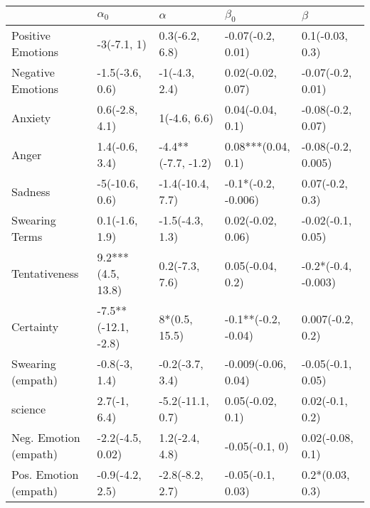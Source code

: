 \begin{tabular}{lllll}
\toprule
{} &           $\alpha_0$ &            $\alpha$ &            $\beta_0$ &              $\beta$ \\
\midrule
Positive Emotions     &          -3(-7.1, 1) &      0.3(-6.2, 6.8) &    -0.07(-0.2, 0.01) &      0.1(-0.03, 0.3) \\
Negative Emotions     &      -1.5(-3.6, 0.6) &       -1(-4.3, 2.4) &    0.02(-0.02, 0.07) &    -0.07(-0.2, 0.01) \\
Anxiety               &       0.6(-2.8, 4.1) &        1(-4.6, 6.6) &     0.04(-0.04, 0.1) &    -0.08(-0.2, 0.07) \\
Anger                 &       1.4(-0.6, 3.4) &  -4.4**(-7.7, -1.2) &   0.08***(0.04, 0.1) &   -0.08(-0.2, 0.005) \\
Sadness               &       -5(-10.6, 0.6) &    -1.4(-10.4, 7.7) &  -0.1*(-0.2, -0.006) &      0.07(-0.2, 0.3) \\
Swearing Terms        &       0.1(-1.6, 1.9) &     -1.5(-4.3, 1.3) &    0.02(-0.02, 0.06) &    -0.02(-0.1, 0.05) \\
Tentativeness         &    9.2***(4.5, 13.8) &      0.2(-7.3, 7.6) &     0.05(-0.04, 0.2) &  -0.2*(-0.4, -0.003) \\
Certainty             &  -7.5**(-12.1, -2.8) &       8*(0.5, 15.5) &  -0.1**(-0.2, -0.04) &     0.007(-0.2, 0.2) \\
Swearing (empath)     &        -0.8(-3, 1.4) &     -0.2(-3.7, 3.4) &  -0.009(-0.06, 0.04) &    -0.05(-0.1, 0.05) \\
science               &         2.7(-1, 6.4) &    -5.2(-11.1, 0.7) &     0.05(-0.02, 0.1) &      0.02(-0.1, 0.2) \\
Neg. Emotion (empath) &     -2.2(-4.5, 0.02) &      1.2(-2.4, 4.8) &       -0.05(-0.1, 0) &     0.02(-0.08, 0.1) \\
Pos. Emotion (empath) &      -0.9(-4.2, 2.5) &     -2.8(-8.2, 2.7) &    -0.05(-0.1, 0.03) &      0.2*(0.03, 0.3) \\
\bottomrule
\end{tabular}
